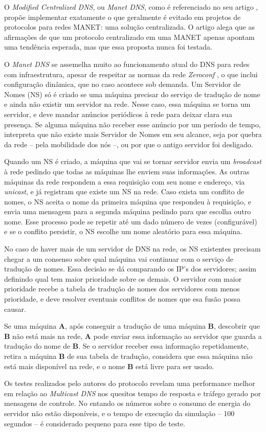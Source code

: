   O \textit{Modified Centralized DNS}, ou \textit{Manet DNS}, como é referenciado no seu artigo \cite{mcdns}, propõe implementar exatamente o que geralmente é evitado em projetos de protocolos para redes MANET: uma solução centralizada. O artigo alega que as afirmações de que um protocolo centralizado em uma MANET apenas apontam uma tendência esperada, mas que essa proposta nunca foi testada.
  
  O \textit{Manet DNS} se assemelha muito ao funcionamento atual do DNS para redes com infraestrutura, apesar de respeitar as normas da rede \textit{Zeroconf} \cite{zeroconf}, o que inclui configuração dinâmica, que no caso acontece sob demanda. Um Servidor de Nomes (NS) só é criado se uma máquina precisar do serviço de tradução de nome e ainda não existir um servidor na rede. Nesse caso, essa máquina se torna um servidor, e deve mandar anúncios periódicos à rede para deixar clara sua presença. Se alguma máquina não receber esse anúncio por um período de tempo, interpreta que não existe mais Servidor de Nomes em seu alcance, seja por quebra da rede -- pela mobilidade dos nós --, ou por que o antigo servidor foi desligado.
  
  Quando um NS é criado, a máquina que vai se tornar servidor envia um \textit{broadcast} à rede pedindo que todas as máquinas lhe enviem suas informações. As outras máquinas da rede respondem a essa requisição com seu nome e endereço, via \textit{unicast}, e já registram que existe um NS na rede. Caso exista um conflito de nomes, o NS aceita o nome da primeira máquina que respondeu à requisição, e envia uma mensagem para a segunda máquina pedindo para que escolha outro nome. Esse processo pode se repetir até um dado número de vezes (configurável) e se o conflito persistir, o NS escolhe um nome aleatório para essa máquina.
  
  No caso de haver mais de um servidor de DNS na rede, os NS existentes precisam chegar a um consenso sobre qual máquina vai continuar com o serviço de tradução de nomes. Essa decisão se dá comparando os IP's dos servidores; assim definindo qual tem maior prioridade sobre os demais. O servidor com maior prioridade recebe a tabela de tradução de nomes dos servidores com menos prioridade, e deve resolver eventuais conflitos de nomes que esa fusão possa causar.
  
  Se uma máquina \textbf{A}, após conseguir a tradução de uma máquina \textbf{B}, descobrir que \textbf{B} não está mais na rede, \textbf{A} pode enviar essa informação ao servidor que guarda a tradução do nome de \textbf{B}. Se o servidor receber essa informação repetidamente, retira a máquina \textbf{B} de sua tabela de tradução, considera que essa máquina não está mais disponível na rede, e o nome \textbf{B} está livre para ser usado.
  
  Os testes realizados pelo autores do protocolo revelam uma performance melhor em relação ao \textit{Multicast DNS} nos quesitos tempo de resposta e tráfego gerado por mensagens de controle. No entando os números sobre o consumo de energia do servidor não estão disponíveis, e o tempo de execução da simulação -- 100 segundos -- é considerado pequeno para esse tipo de teste.